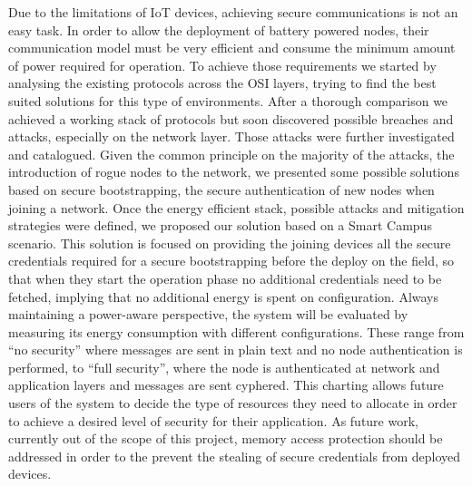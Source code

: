 Due to the limitations of \ac{IoT} devices, achieving secure communications is not an easy task. In order to allow the deployment of battery powered nodes, their communication model must be very efficient and consume the minimum amount of power required for operation. To achieve those requirements we started by analysing the existing protocols across the OSI layers, trying to find the best suited solutions for this type of environments. After a thorough comparison we achieved a working stack of protocols but soon discovered possible breaches and attacks, especially on the network layer. Those attacks were further investigated and catalogued. Given the common principle on the majority of the attacks, the introduction of rogue nodes to the network, we presented some possible solutions based on secure bootstrapping, the secure authentication of new nodes when joining a network.
Once the energy efficient stack, possible attacks and mitigation strategies were defined, we proposed our solution based on a Smart Campus scenario. This solution is focused on providing the joining devices all the secure credentials required for a secure bootstrapping before the deploy on the field, so that when they start the operation phase no additional credentials need to be fetched, implying that no additional energy is spent on configuration.
Always maintaining a power-aware perspective, the system will be evaluated by measuring its energy consumption with different configurations. These range from ``no security'' where messages are sent in plain text and no node authentication is performed, to ``full security'', where the node is authenticated at network and application layers and messages are sent cyphered. This charting allows future users of the system to decide the type of resources they need to allocate in order to achieve a desired level of security for their application. As future work, currently out of the scope of this project, memory access protection should be addressed in order to the prevent the stealing of secure credentials from deployed devices.